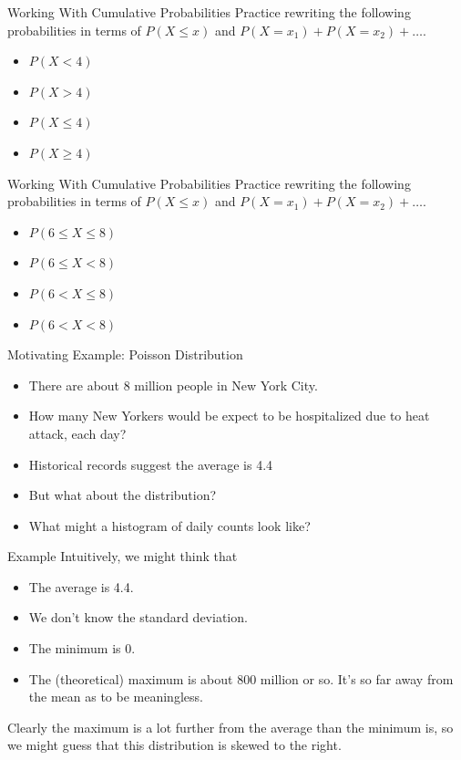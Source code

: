 \begin{frame}{Working With Cumulative Probabilities}
    Practice rewriting the following probabilities in terms of $P(X \le x)$ and $P(X=x_1)+P(X=x_2)+\dots$.
    \begin{itemize}
        \item $P(X < 4)$
        \item $P(X > 4)$
        \item $P(X \le 4)$
        \item $P(X \ge 4)$
    \end{itemize}
\end{frame}

\begin{frame}{Working With Cumulative Probabilities}
    Practice rewriting the following probabilities in terms of $P(X \le x)$ and $P(X=x_1)+P(X=x_2)+\dots$.
    \begin{itemize}
        \item $P(6 \le X \le 8)$
        \item $P(6 \le X < 8)$
        \item $P(6 < X \le 8)$
        \item $P(6 < X < 8)$
    \end{itemize}
\end{frame}

\begin{frame}{Motivating Example: Poisson Distribution}
    \begin{itemize}
        \item There are about 8 million people in New York City.
        \item How many New Yorkers would be expect to be hospitalized due to heat attack, each day?
        \item Historical records suggest the average is 4.4
        \item But what about the distribution? 
        \item What might a histogram of daily counts look like?
    \end{itemize}
\end{frame}

\begin{frame}{Example}
    Intuitively, we might think that
    \begin{itemize}
        \item The average is 4.4.
        \item We don't know the standard deviation.
        \item The minimum is 0.
        \item The (theoretical) maximum is about 800 million or so. It's so far away from the mean as to be meaningless.
    \end{itemize}
    Clearly the maximum is a lot further from the average than the minimum is, so we might guess that this distribution is skewed to the right.
\end{frame}

